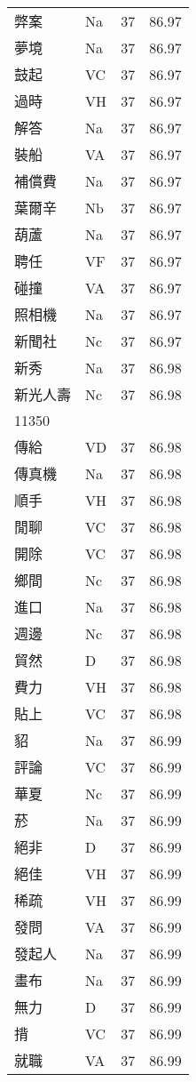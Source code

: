 \documentclass[twocolumn]{book}
\begin{document}
\begin{supertabular}{llrr}
弊案 & Na & 37 &  86.97\\
夢境 & Na & 37 &  86.97\\
鼓起 & VC & 37 &  86.97\\
過時 & VH & 37 &  86.97\\
解答 & Na & 37 &  86.97\\
裝船 & VA & 37 &  86.97\\
補償費 & Na & 37 &  86.97\\
葉爾辛 & Nb & 37 &  86.97\\
葫蘆 & Na & 37 &  86.97\\
聘任 & VF & 37 &  86.97\\
碰撞 & VA & 37 &  86.97\\
照相機 & Na & 37 &  86.97\\
新聞社 & Nc & 37 &  86.97\\
新秀 & Na & 37 &  86.98\\
新光人壽 & Nc & 37 &  86.98\\
11350\\
傳給 & VD & 37 &  86.98\\
傳真機 & Na & 37 &  86.98\\
順手 & VH & 37 &  86.98\\
閒聊 & VC & 37 &  86.98\\
開除 & VC & 37 &  86.98\\
鄉間 & Nc & 37 &  86.98\\
進口 & Na & 37 &  86.98\\
週邊 & Nc & 37 &  86.98\\
貿然 & D & 37 &  86.98\\
費力 & VH & 37 &  86.98\\
貼上 & VC & 37 &  86.98\\
貂 & Na & 37 &  86.99\\
評論 & VC & 37 &  86.99\\
華夏 & Nc & 37 &  86.99\\
菸 & Na & 37 &  86.99\\
絕非 & D & 37 &  86.99\\
絕佳 & VH & 37 &  86.99\\
稀疏 & VH & 37 &  86.99\\
發問 & VA & 37 &  86.99\\
發起人 & Na & 37 &  86.99\\
畫布 & Na & 37 &  86.99\\
無力 & D & 37 &  86.99\\
揹 & VC & 37 &  86.99\\
就職 & VA & 37 &  86.99\\

\end{supertabular}
\end{document}
